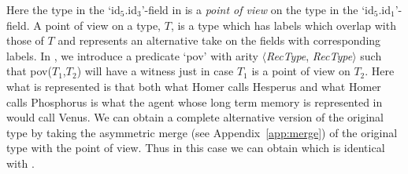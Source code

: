 Here the type in the `id$_5$.id$_3$'-field in \preveg{} is a
\textit{point of view} on the type in the `id$_5$.id$_1$'-field.  A
point of view on a type, $T$, is a type which has labels which overlap
with those of $T$ and represents an alternative take on the fields
with corresponding labels.  In \preveg{}, we introduce a predicate `pov' with arity
$\langle$\textit{RecType}, \textit{RecType}$\rangle$ such that
pov($T_1$,$T_2$) will have a witness just in case $T_1$ is a point of
view on $T_2$.  Here what is represented is that both what Homer calls
Hesperus and what Homer calls Phosphorus is what the agent whose long
term memory is represented in \preveg{} would call Venus.  We can
obtain a complete alternative version of the original type by taking
the asymmetric merge (see Appendix~\ref{app:merge}) of the original
type with the point of view.  Thus in this case we can obtain
 which is identical with .
